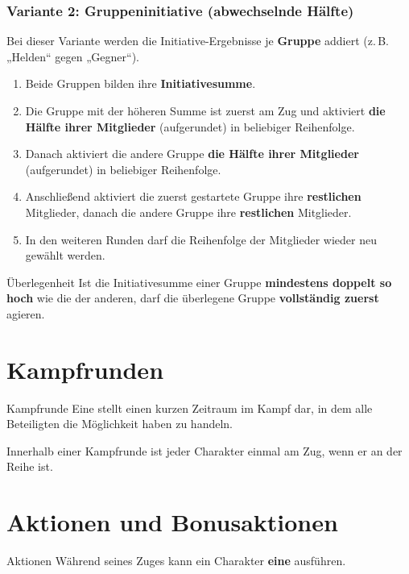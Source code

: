 \subsubsection*{Variante 2: Gruppeninitiative (abwechselnde Hälfte)}
Bei dieser Variante werden die Initiative-Ergebnisse je \textbf{Gruppe} addiert
(z.\,B. „Helden“ gegen „Gegner“).

\begin{enumerate}
	\item Beide Gruppen bilden ihre \textbf{Initiativesumme}.
	\item Die Gruppe mit der höheren Summe ist zuerst am Zug und aktiviert
	\textbf{die Hälfte ihrer Mitglieder} (aufgerundet) in beliebiger Reihenfolge.
	\item Danach aktiviert die andere Gruppe \textbf{die Hälfte ihrer Mitglieder}
	(aufgerundet) in beliebiger Reihenfolge.
	\item Anschließend aktiviert die zuerst gestartete Gruppe ihre \textbf{restlichen}
	Mitglieder, danach die andere Gruppe ihre \textbf{restlichen} Mitglieder.
	\item In den weiteren Runden darf die Reihenfolge der Mitglieder wieder neu gewählt werden.
\end{enumerate}

\begin{rulebox}{Überlegenheit}
	Ist die Initiativesumme einer Gruppe \textbf{mindestens doppelt so hoch} wie die
	der anderen, darf die überlegene Gruppe \textbf{vollständig zuerst} agieren.
\end{rulebox}
 

\section{Kampfrunden}

\begin{rulebox}{Kampfrunde}
	Eine  stellt einen kurzen Zeitraum im Kampf dar, in dem alle
	Beteiligten die Möglichkeit haben zu handeln.
\end{rulebox}

Innerhalb einer Kampfrunde ist jeder Charakter einmal am Zug, wenn er an der
Reihe ist.

\section{Aktionen und Bonusaktionen}

\begin{rulebox}{Aktionen}
	Während seines Zuges kann ein Charakter \textbf{eine } ausführen.
\end{rulebox}

